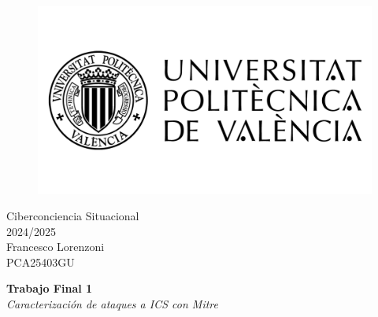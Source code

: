 \begin{titlepage}
   \begin{figure}
      \vspace{50mm}
       \centering
       \includegraphics[keepaspectratio=true,width=0.40\columnwidth]{images/upvLogo.png}
   \end{figure}
   
   \vspace{40mm}
   \begin{center}
       \LARGE{Ciberconciencia Situacional}
       \vspace{2.5mm}
       \\ \large{2024/2025}
       \vspace{5mm}
       \\ \large{Francesco Lorenzoni\\\textsc{PCA25403GU}}
   \end{center}
   
   \begin{center}
      \vspace{10mm}
       {\LARGE{\textbf{Trabajo Final 1}\\ \vspace{5mm}
       \textit{Caracterización de ataques a ICS con Mitre}}}
       
   \end{center}
\end{titlepage}